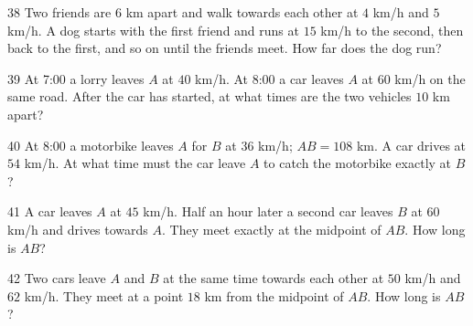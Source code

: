 \gap
\begin{probbox}{38}{}
Two friends are $6$ km apart and walk towards each other at $4$ km/h and $5$ km/h. A dog starts with the first friend and runs at $15$ km/h to the second, then back to the first, and so on until the friends meet. How far does the dog run?
\end{probbox}
\gap
\begin{probbox}{39}{}
At 7:00 a lorry leaves $A$ at $40$ km/h. At 8:00 a car leaves $A$ at $60$ km/h on the same road. After the car has started, at what times are the two vehicles $10$ km apart?
\end{probbox}
\gap
\begin{probbox}{40}{}
At 8:00 a motorbike leaves $A$ for $B$ at $36$ km/h; $AB=108$ km. A car drives at $54$ km/h. At what time must the car leave $A$ to catch the motorbike exactly at $B$?
\end{probbox}
\gap
\begin{probbox}{41}{}
A car leaves $A$ at $45$ km/h. Half an hour later a second car leaves $B$ at $60$ km/h and drives towards $A$. They meet exactly at the midpoint of $AB$. How long is $AB$?
\end{probbox}
\gap
\begin{probbox}{42}{}
Two cars leave $A$ and $B$ at the same time towards each other at $50$ km/h and $62$ km/h. They meet at a point $18$ km from the midpoint of $AB$. How long is $AB$?
\end{probbox}
